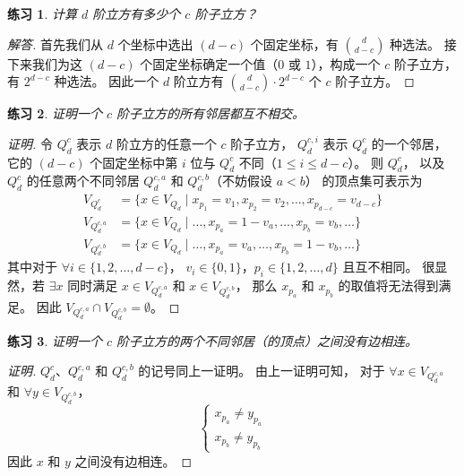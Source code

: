 \documentclass[12pt, a4paper]{article}
\newtheorem{exercisewithanswer}{练习}
\newenvironment{answer}[1][Answer]{
	\begin{proof}[#1]
	\let\qed\relax
}{
	\end{proof}
}
\begin{document}
\begin{exercisewithanswer}
计算 $d$ 阶立方有多少个 $c$ 阶子立方？
\end{exercisewithanswer}

\begin{answer}[解答]
首先我们从 $d$ 个坐标中选出 $(d - c)$ 个固定坐标，有 $\binom{d}{d - c}$ 种选法。
接下来我们为这 $(d - c)$ 个固定坐标确定一个值（$0$ 或 $1$），构成一个 $c$ 阶子立方，
有 $2^{d - c}$ 种选法。
因此一个 $d$ 阶立方有 $\binom{d}{d - c} \cdot 2^{d - c}$ 个 $c$ 阶子立方。
\end{answer}

\begin{exercisewithanswer}
证明一个 $c$ 阶子立方的所有邻居都互不相交。
\end{exercisewithanswer}

\begin{proof}[证明]
令 $Q_d^c$ 表示 $d$ 阶立方的任意一个 $c$ 阶子立方，
$Q_d^{c, i}$ 表示 $Q_d^c$ 的一个邻居，
它的 $(d - c)$ 个固定坐标中第 $i$ 位与 $Q_d^c$ 不同（$1 \le i \le d - c$）。
则 $Q_d^c$，
以及 $Q_d^c$ 的任意两个不同邻居 $Q_d^{c, a}$ 和 $Q_d^{c, b}$（不妨假设 $a < b$）
的顶点集可表示为
\begin{align*}
V_{Q_d^c}      & = \{x \in V_{Q_d} \mid
		   x_{p_1} = v_1, x_{p_2} = v_2, \dots, x_{p_{d - c}} = v_{d - c}\} \\
V_{Q_d^{c, a}} & = \{x \in V_{Q_d} \mid
		   \dots, x_{p_a} = 1 - v_a, \dots, x_{p_b} = v_b, \dots\} \\
V_{Q_d^{c, b}} & = \{x \in V_{Q_d} \mid
		   \dots, x_{p_a} = v_a, \dots, x_{p_b} = 1 - v_b, \dots\}
\end{align*}
其中对于 $\forall i \in \{1, 2, \dots, d - c\}$，
$v_i \in \{0, 1\}$，$p_i \in \{1, 2, \dots, d\}$ 且互不相同。
很显然，若 $\exists x$ 同时满足 $x \in V_{Q_d^{c, a}}$ 和 $x \in V_{Q_d^{c, b}}$，
那么 $x_{p_a}$ 和 $x_{p_b}$ 的取值将无法得到满足。
因此 $V_{Q_d^{c, a}} \cap V_{Q_d^{c, b}} = \emptyset$。
\end{proof}

\begin{exercisewithanswer}
证明一个 $c$ 阶子立方的两个不同邻居（的顶点）之间没有边相连。
\end{exercisewithanswer}

\begin{proof}[证明]
$Q_d^c$、$Q_d^{c, a}$ 和 $Q_d^{c, b}$ 的记号同上一证明。
由上一证明可知，
对于 $\forall x \in V_{Q_d^{c, a}}$ 和 $\forall y \in V_{Q_d^{c, b}}$，
\begin{equation*}
\begin{cases}
x_{p_a} \neq y_{p_a} \\
x_{p_b} \neq y_{p_b}
\end{cases}
\end{equation*}
因此 $x$ 和 $y$ 之间没有边相连。
\end{proof}
\end{document}
